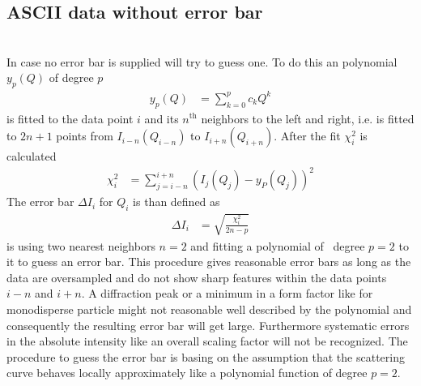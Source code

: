 \subsection{ASCII data without error bar} \hspace{1pt}\\

\noindent
In case no error bar is supplied \SASfit will try to guess one.
To do this an polynomial $y_p(Q)$ of degree $p$
\begin{align}
y_p(Q) &= \sum_{k=0}^p c_k Q^k
\end{align}
is fitted to the data point $i$ and its $n^\textrm{th}$ neighbors to the left and right,
i.e. is fitted to $2n+1$ points from $I_{i-n}(Q_{i-n})$ to $I_{i+n}(Q_{i+n})$.
After the fit $\chi_i^2$ is calculated
\begin{align}
\chi_i^2&=\sum_{j=i-n}^{i+n} \left(I_j(Q_j)-y_P(Q_j)\right)^2
\end{align}
The error bar $\Delta I_i$ for $Q_i$ is than defined as
\begin{align}
\Delta I_i &= \sqrt{\frac{\chi_i^2}{2n-p}}
\end{align}
\SASfit is using two nearest neighbors $n=2$ and fitting a polynomial of \
degree $p=2$ to it to guess an error bar.
This procedure gives reasonable error bars as long as the data are oversampled and do not show sharp features within the data points $i-n$ and $i+n$. A diffraction peak or a minimum in a form factor like for monodisperse particle might not reasonable well described by the polynomial and consequently the resulting error bar will get large. Furthermore systematic errors in the absolute intensity like an overall scaling factor will not be recognized. The procedure to guess the error bar is basing on the assumption that the scattering curve behaves locally approximately like a polynomial function of degree $p=2$.

